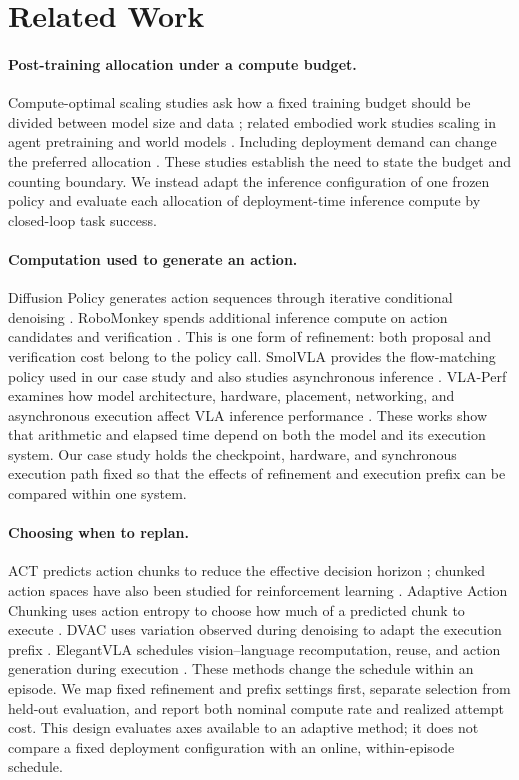 \documentclass{article}
\begin{document}
\section{Related Work}

\paragraph{Post-training allocation under a compute budget.}
Compute-optimal scaling studies ask how a fixed training budget should be divided
between model size and data \cite{chinchilla}; related embodied work studies
scaling in agent pretraining and world models \cite{pearcescaling}. Including
deployment demand can change the preferred allocation \cite{beyondchinchilla}.
These studies establish the need to state the budget and counting boundary. We
instead adapt the inference configuration of one frozen policy and evaluate
each allocation of deployment-time inference compute by closed-loop task success.

\paragraph{Computation used to generate an action.}
Diffusion Policy generates action sequences through iterative conditional
denoising \cite{diffusionpolicy}.
RoboMonkey spends additional inference compute on action candidates and
verification \cite{robomonkey}. This is one form of refinement: both proposal and
verification cost belong to the policy call. SmolVLA provides the flow-matching
policy used in our case study and also studies asynchronous inference
\cite{smolvla}. VLA-Perf examines how model
architecture, hardware, placement, networking, and asynchronous execution affect
VLA inference performance \cite{vlaperf}. These works show that arithmetic and
elapsed time depend on both the model and its execution system. Our case study
holds the checkpoint, hardware, and synchronous execution path fixed so that the
effects of refinement and execution prefix can be compared within one system.

\paragraph{Choosing when to replan.}
ACT predicts action chunks to reduce the effective decision horizon
\cite{act}; chunked action spaces have also been studied for reinforcement
learning \cite{qchunking}.
Adaptive Action Chunking uses action entropy to choose how much of a predicted
chunk to execute \cite{adaptivechunking}. DVAC uses variation observed during
denoising to adapt the execution prefix \cite{dvac}. ElegantVLA schedules
vision--language recomputation, reuse, and action generation during execution
\cite{elegantvla}. These methods change the schedule within an episode. We map
fixed refinement and prefix settings first, separate selection from held-out
evaluation, and report both nominal compute rate and realized attempt cost.
This design evaluates axes available to an adaptive method; it does not compare
a fixed deployment configuration with an online, within-episode schedule.
\end{document}

